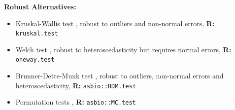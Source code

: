 \documentclass[12pt,english]{article}\usepackage[]{graphicx}\usepackage[table]{xcolor}
\begin{document}
\noindent \textbf{Robust Alternatives:}
\begin{small}
\begin{itemize}
\item Kruskal-Wallis test \citep{kruskal1952}, robust to outliers and non-normal errors, \textbf{R:} \texttt{kruskal.test}\vspace{-.1in}
\item Welch test \citep{welch1951}, robust to heteroscedasticity but requires normal errors, \textbf{R:} \texttt{oneway.test}\vspace{-.1in}
\item Brunner-Dette-Munk test \citep{brunner1997}, robust to outliers, non-normal errors and heteroscedasticity, \textbf{R:} \texttt{asbio::BDM.test}\vspace{-.1in}
\item Permutation tests \citep[see][]{manly2006}, \textbf{R:} \texttt{asbio::MC.test}
\end{itemize}
\end{small}
\vspace{0.1in}
\end{document}

